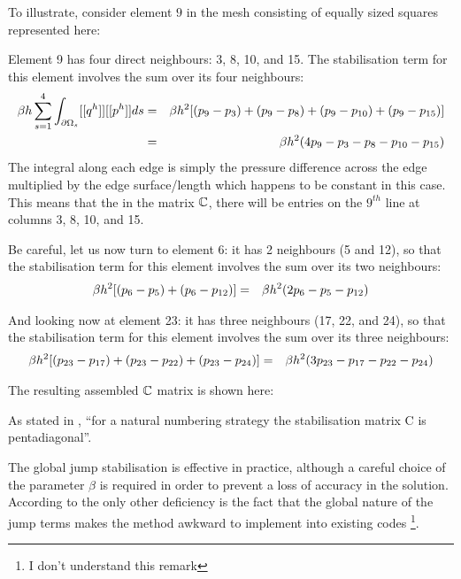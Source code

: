 To illustrate, consider element $9$ in the mesh consisting of equally  sized squares represented here:
\begin{center}

\end{center}
Element 9 has four direct neighbours: 3, 8, 10, and 15.
The stabilisation term for this element involves the sum over its four neighbours:
\begin{eqnarray}
\beta h \sum_{s=1}^{4} \int_{\partial \Omega_s}[[ q^h ]]  [[p^h ]] ds
&=& \beta h^2 [ (p_9-p_3)+(p_9-p_8)+(p_9-p_{10})+(p_9-p_{15})   ]  \nonumber\\
&=& \beta h^2 ( 4 p_9-p_3 -p_8-p_{10} -p_{15})  \nonumber
\end{eqnarray}
The integral along each edge is simply the pressure difference across the edge 
multiplied by the edge surface/length which happens to be constant in this case.
This means that the in the matrix ${\mathbb{C}}$, there will be entries on the $9^{th}$
line at columns 3, 8, 10, and 15. 

Be careful, let us now turn to element 6: it has 2 neighbours (5 and 12), so that
the stabilisation term for this element involves the sum over its two neighbours:
\begin{eqnarray}
 \beta h^2 [ (p_6-p_5)+(p_6-p_{12})  ]  
&=& \beta h^2 ( 2 p_6-p_5 -p_{12} )  \nonumber
\end{eqnarray}

And looking now at element 23: it has three neighbours (17, 22, and 24), so that 
the stabilisation term for this element involves the sum over its three neighbours:
\begin{eqnarray}
\beta h^2 [ (p_{23}-p_{17})+(p_{23}-p_{22}) +(p_{23}-p_{24})  ] 
&=& \beta h^2 ( 3 p_{23}-p_{17} -p_{22} - p_{24} )  \nonumber
\end{eqnarray}

The resulting assembled ${\mathbb{C}}$ matrix is shown here:
\begin{center}

\end{center}
As stated in \cite{sike90}, ``for a natural numbering strategy the stabilisation matrix C is pentadiagonal''.

The global jump stabilisation is effective in practice, although a careful choice of the parameter $\beta$ is required in order to prevent a loss of accuracy in the solution. According to \textcite{sike90} the only other deficiency is the fact that the global nature of the jump terms makes the method awkward to implement into existing codes \footnote{I don't understand this remark}.

